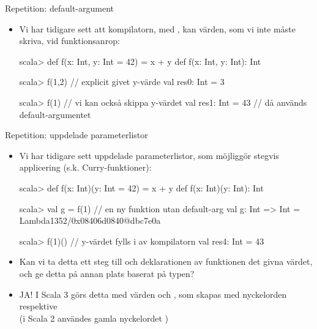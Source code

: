 \begin{Slide}{Repetition: default-argument}\SlideFontSmall
\begin{itemize}\SlideFontSmall
\item Vi har tidigare sett att kompilatorn, med , kan  värden, som vi inte måste skriva, vid funktionsanrop:
\begin{REPLnonum}
scala> def f(x: Int, y: Int = 42) = x + y
def f(x: Int, y: Int): Int

scala> f(1,2)        // explicit givet y-värde
val res0: Int = 3

scala> f(1)          // vi kan också skippa y-värdet  
val res1: Int = 43   // då används default-argumentet
\end{REPLnonum}
\end{itemize}
\end{Slide}


\begin{Slide}{Repetition: uppdelade parameterlistor}\SlideFontSmall
\begin{itemize}\SlideFontSmall
\item Vi har tidigare sett uppdelade parameterlistor, som möjliggör stegvis applicering (s.k. Curry-funktioner):
\begin{REPLsmall}
scala> def f(x: Int)(y: Int = 42) = x + y
def f(x: Int)(y: Int): Int

scala> val g = f(1)  // en ny funktion utan default-arg
val g: Int => Int = Lambda1352/0x08406d0840@dbc7e0a

scala> f(1)()   // y-värdet fylls i av kompilatorn
val res4: Int = 43
\end{REPLsmall}
\pause
\item  Kan vi ta detta ett steg till och  deklarationen av funktionen  det givna värdet, och ge detta på annan plats baserat på typen?
\pause 
\item JA! I Scala 3 görs detta med  värden och , som skapas med nyckelorden  respektive \\(i Scala 2 användes gamla nyckelordet )
\end{itemize}
\end{Slide}

